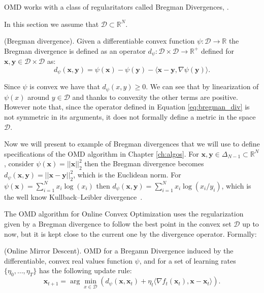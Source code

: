 OMD works with a class of regularitators called Bregman Divergences, \cite{banerjee2005clustering}.

In this section we assume that $\mathcal D\subset \mathbb R^N$.

\begin{definition}(Bregman divergence). Given a differentiable convex function $\psi:\mathcal D\to\mathbb R$ the Bregman divergence is defined as an operator $d_{\psi}:\mathcal D\times\mathcal D\to \mathbb R^+$ defined for $\mathbf x,\mathbf y\in\mathcal D\times\mathcal D$ as: 
\begin{equation}\label{eq:bregman_div}
d_\psi(\mathbf x,\mathbf y)=\psi(\mathbf x)-\psi(\mathbf y)-\langle \mathbf x-\mathbf y,\nabla \psi(\mathbf y)\rangle.
\end{equation}
\end{definition}

Since $\psi$ is convex we have that $d_\psi(x,y)\ge0$. We can see that by linearization of $\psi(x)$ around $y\in\mathcal D$ and thanks to convexity the other terms are positive. However note that, since the operator defined in Equation \eqref{eq:bregman_div} is not symmetric in its arguments, it does not formally define a metric in the space $\mathcal D$.

Now we will present to example of Bregman divergences that we will use to define specifications of the OMD algorithm in Chapter \ref{ch:algos}.
For $\mathbf x,\mathbf y\in\Delta_{N-1}\subset \mathbb R^N$, consider $\psi(\mathbf x)=||\mathbf x||_2^2$ then the Bregman divergence becomes $d_\psi(\mathbf x,\mathbf y)=||\mathbf x-\mathbf y||_2^2$, which is the Euclidean norm. For $\psi(\mathbf x)=\sum\limits_{i=1}^Nx_i\log(x_i)$ then $d_\psi(\mathbf x,\mathbf y)=\sum\limits_{i=1}^Nx_i\log(x_i/y_i)$, which is the well know Kullback–Leibler divergence~\cite{van2014renyi}.

The OMD algorithm for Online Convex Optimization uses the regularization given by a Bregman divergence to follow the best point in the convex set $\mathcal D$ up to now, but it is kept close to the current one by the divergence operator. Formally:

\begin{definition}(Online Mirror Descent). OMD for a Bregamn Divergence induced by the differentiable, convex real values function $\psi$, and for a set of learning rates $\{\eta_0,\ldots,\eta_T\}$ has the following update rule: 
$$\mathbf x_{t+1} =\arg\min\limits_{x\in\mathcal D} \left(d_\psi(\mathbf x,\mathbf x_t)+\eta_t\langle\nabla f_t(\mathbf x_t),\mathbf x-\mathbf x_t\rangle\right).$$
\end{definition}

